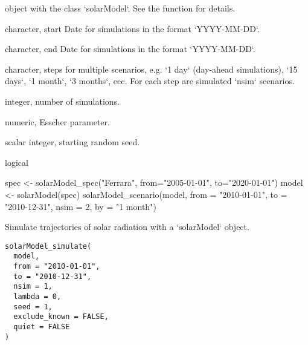 \documentclass[a4paper]{book}
\begin{document}
\begin{Arguments}
\begin{ldescription}
\item[\code{model}] object with the class `solarModel`. See the function  for details.

\item[\code{from}] character, start Date for simulations in the format `YYYY-MM-DD`.

\item[\code{to}] character, end Date for simulations in the format `YYYY-MM-DD`.

\item[\code{by}] character, steps for multiple scenarios, e.g. `1 day` (day-ahead simulations), `15 days`, `1 month`, `3 months`, ecc.
For each step are simulated `nsim` scenarios.

\item[\code{nsim}] integer, number of simulations.

\item[\code{lambda}] numeric, Esscher parameter.

\item[\code{seed}] scalar integer, starting random seed.

\item[\code{quiet}] logical
\end{ldescription}
\end{Arguments}
%
\begin{Examples}
\begin{ExampleCode}
spec <- solarModel_spec("Ferrara", from="2005-01-01", to="2020-01-01")
model <- solarModel(spec)
solarModel_scenario(model, from = "2010-01-01", to = "2010-12-31", nsim = 2, by = "1 month")

\end{ExampleCode}
\end{Examples}
%
\begin{Description}\relax
Simulate trajectories of solar radiation with a `solarModel` object.
\end{Description}
%
\begin{Usage}
\begin{verbatim}
solarModel_simulate(
  model,
  from = "2010-01-01",
  to = "2010-12-31",
  nsim = 1,
  lambda = 0,
  seed = 1,
  exclude_known = FALSE,
  quiet = FALSE
)
\end{verbatim}
\end{Usage}
\end{document}
